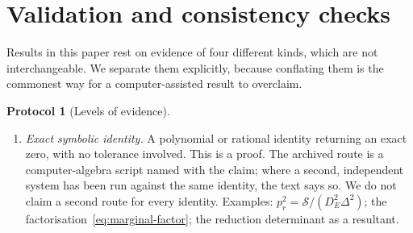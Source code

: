 \documentclass[12pt]{iopart}
\theoremstyle{plain}
\theoremstyle{definition}
\newtheorem{protocol}{Protocol}
\theoremstyle{remark}
\begin{document}
\appendix
\section{Validation and consistency checks}
\label{app:validation}
Results in this paper rest on evidence of four different kinds, which are not
interchangeable. We separate them explicitly, because conflating them is the
commonest way for a computer-assisted result to overclaim.

\begin{protocol}[Levels of evidence]
\label{prot:evidence}
\begin{enumerate}
\item[\rm(I)] \emph{Exact symbolic identity.} A polynomial or rational identity
returning an exact zero, with no tolerance involved. This is a proof. The archived
route is a computer-algebra script named with the claim; where a second, independent
system has been run against the same identity, the text says so. We do not claim a
second route for every identity. Examples: $p_r^2=\mathcal S/(D_E^2\Delta^2)$;
the factorisation~\eqref{eq:marginal-factor}; the reduction determinant as a
resultant.


\end{enumerate}
\end{protocol}
\end{document}
